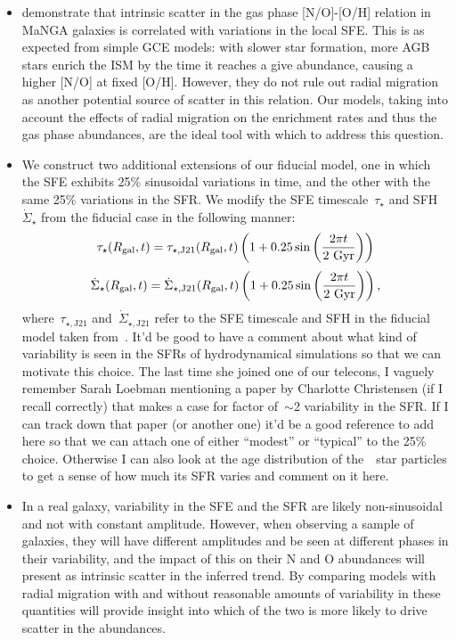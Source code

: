 \documentclass[ms.tex]{subfiles}
\begin{document}
\begin{itemize} 
	\item \citet{Schaefer2020} demonstrate that intrinsic scatter in the gas 
	phase [N/O]-[O/H] relation in MaNGA galaxies is correlated with variations 
	in the local SFE. 
	This is as expected from simple GCE models: with slower star formation, 
	more AGB stars enrich the ISM by the time it reaches a give abundance, 
	causing a higher [N/O] at fixed [O/H]. 
	However, they do not rule out radial migration as another potential source 
	of scatter in this relation. 
	Our models, taking into account the effects of radial migration on the 
	enrichment rates and thus the gas phase abundances, are the ideal tool 
	with which to address this question. 

	\item We construct two additional extensions of our fiducial model, one 
	in which the SFE exhibits 25\% sinusoidal variations in time, and the other 
	with the same 25\% variations in the SFR. 
	We modify the SFE timescale~$\tau_\star$ and SFH~$\dot{\Sigma}_\star$ from 
	the fiducial case in the following manner: 
	\begin{equation} 
	\tau_\star(R_\text{gal}, t) = \tau_{\star,\text{J21}}(R_\text{gal}, t)\left(1 + 0.25\sin 
	\left(\frac{2\pi t}{2\text{ Gyr}}\right)\right)
	\end{equation} 
	\begin{equation} 
	\dot{\Sigma}_\star(R_\text{gal}, t) = \dot{\Sigma}_{\star,\text{J21}}(R_\text{gal}, t) 
	\left(1 + 0.25\sin \left(\frac{2\pi t}{2\text{ Gyr}}\right)\right), 
	\end{equation} 
	where~$\tau_{\star,\text{J21}}$ and~$\dot{\Sigma}_{\star,\text{J21}}$ refer 
	to the SFE timescale and SFH in the fiducial model taken 
	from~\citet{Johnson2021}. 
	{\color{red} 
	It'd be good to have a comment about what kind of variability is seen in 
	the SFRs of hydrodynamical simulations so that we can motivate this choice. 
	The last time she joined one of our telecons, I vaguely remember Sarah 
	Loebman mentioning a paper by Charlotte Christensen (if I recall correctly) 
	that makes a case for factor of~$\sim$2 variability in the SFR. 
	If I can track down that paper (or another one) it'd be a good reference to 
	add here so that we can attach one of either ``modest'' or ``typical'' to 
	the 25\% choice. 
	Otherwise I can also look at the age distribution of the~\hsim~star 
	particles to get a sense of how much its SFR varies and comment on it here. 
	}

	\item In a real galaxy, variability in the SFE and the SFR are likely 
	non-sinusoidal and not with constant amplitude. 
	However, when observing a sample of galaxies, they will have different 
	amplitudes and be seen at different phases in their variability, and the 
	impact of this on their N and O abundances will present as intrinsic 
	scatter in the inferred trend. 
	By comparing models with radial migration with and without reasonable 
	amounts of variability in these quantities will provide insight into which 
	of the two is more likely to drive scatter in the abundances. 


\end{itemize}
\end{document}
